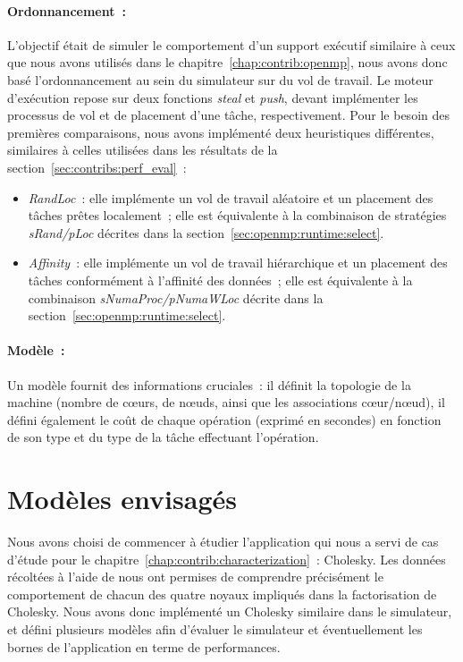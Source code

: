 \paragraph{Ordonnancement~:}
L'objectif était de simuler le comportement d'un support exécutif similaire à ceux que nous avons utilisés dans le chapitre~\ref{chap:contrib:openmp}, nous avons donc basé l'ordonnancement au sein du simulateur sur du vol de travail.
Le moteur d'exécution repose sur deux fonctions \emph{steal} et \emph{push}, devant implémenter les processus de vol et de placement d'une tâche, respectivement.
Pour le besoin des premières comparaisons, nous avons implémenté deux heuristiques différentes, similaires à celles utilisées dans les résultats de la section~\ref{sec:contribs:perf_eval}~:
\begin{itemize}
  \item \emph{RandLoc}~: elle implémente un vol de travail aléatoire et un placement des tâches prêtes localement~; elle est équivalente à la combinaison de stratégies \emph{sRand/pLoc} décrites dans la section~\ref{sec:openmp:runtime:select}.
  \item \emph{Affinity}~: elle implémente un vol de travail hiérarchique et un placement des tâches conformément à l'affinité des données~; elle est équivalente à la combinaison \emph{sNumaProc/pNumaWLoc} décrite dans la section~\ref{sec:openmp:runtime:select}.
\end{itemize}


\paragraph{Modèle~:}
Un modèle fournit des informations cruciales~: il définit la topologie de la machine (nombre de cœurs, de nœuds, ainsi que les associations cœur/nœud), il défini également le coût de chaque opération (exprimé en secondes) en fonction de son type et du type de la tâche effectuant l'opération.


\section{Modèles envisagés}\label{sec:simulation:modeles}

Nous avons choisi de commencer à étudier l'application qui nous a servi de cas d'étude pour le chapitre~\ref{chap:contrib:characterization}~: Cholesky.
Les données récoltées à l'aide de \outil nous ont permises de comprendre précisément le comportement de chacun des quatre noyaux impliqués dans la factorisation de Cholesky.
Nous avons donc implémenté un Cholesky similaire dans le simulateur, et défini plusieurs modèles afin d'évaluer le simulateur et éventuellement les bornes de l'application en terme de performances.

